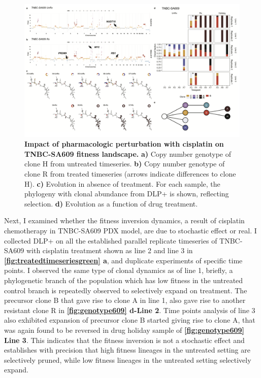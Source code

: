 \begin{figure}
\centering
\includegraphics[width=\textwidth]{Figures/chap4/genePlotSA609.png}
	
\caption[Impact of pharmacologic perturbation with cisplatin on TNBC-SA609 fitness landscape]
	{\small
	\textbf{Impact of pharmacologic perturbation with cisplatin on TNBC-SA609 fitness landscape.}
	 \textbf{a)} Copy number genotype of clone H from untreated timeseries. \textbf{b)} Copy number genotype of clone R from treated timeseries (arrows indicate differences to clone H). \textbf{c)}  Evolution in absence of treatment. For each sample, the phylogeny with clonal abundance from DLP+ is shown, reflecting selection. \textbf{d)} Evolution as a function of drug treatment.}
\label{fig:genotype609}
\end{figure}



Next, I examined whether the fitness inversion dynamics, a result of cisplatin chemotherapy in TNBC-SA609 PDX model, are due to stochastic effect or real.
I collected DLP+ on all the established parallel replicate timeseries of TNBC-SA609 with cisplatin treatment shown as line 2 and line 3 in \textbf{\autoref{fig:treatedtimeseriesgreen} a}, and duplicate experiments of specific time points. I observed the same type of clonal dynamics as of line 1, briefly, a phylogenetic branch of the population which has low fitness in the untreated control branch is repeatedly observed to selectively expand on treatment. The precursor clone B that gave rise to clone A in line 1, also gave rise to another resistant clone R in \textbf{\autoref{fig:genotype609} d-Line 2}. Time points analysis of line 3 also exhibited expansion of precursor clone B started giving rise to clone A, that was again found to be reversed in drug holiday sample of \textbf{\autoref{fig:genotype609} Line 3}. This indicates that the fitness inversion is not a stochastic effect and establishes with precision that high fitness lineages in the untreated setting are selectively pruned, while low fitness lineages in the untreated setting selectively expand.

